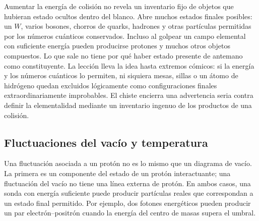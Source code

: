 Aumentar la energía de colisión no revela un inventario fijo de objetos que hubieran estado ocultos dentro del blanco. Abre muchos estados finales posibles: un \(W\), varios bosones, chorros de quarks, hadrones y otras partículas permitidas por los números cuánticos conservados. Incluso al golpear un campo elemental con suficiente energía pueden producirse protones y muchos otros objetos compuestos. Lo que sale no tiene por qué haber estado presente de antemano como constituyente. La lección lleva la idea hasta extremos cómicos: si la energía y los números cuánticos lo permiten, ni siquiera mesas, sillas o un átomo de hidrógeno quedan excluidos lógicamente como configuraciones finales extraordinariamente improbables. El chiste encierra una advertencia seria contra definir la elementalidad mediante un inventario ingenuo de los productos de una colisión.

\subsection{Fluctuaciones del vacío y temperatura}

Una fluctuación asociada a un protón no es lo mismo que un diagrama de vacío. La primera es un componente del estado de un protón interactuante; una fluctuación del vacío no tiene una línea externa de protón. En ambos casos, una sonda con energía suficiente puede producir partículas reales que correspondan a un estado final permitido. Por ejemplo, dos fotones energéticos pueden producir un par electrón--positrón cuando la energía del centro de masas supera el umbral.

\begin{classroomqa}
\end{classroomqa}

\begin{classroomqa}
\end{classroomqa}

